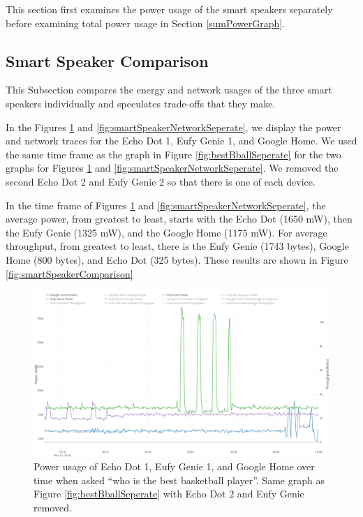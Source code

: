 This section first examines the power usage of the smart speakers separately before examining total power usage in Section \ref{sumPowerGraph}.

\subsection{Smart Speaker Comparison}
\label{smartSpeakerComparisonSection}
This Subsection compares the energy and network usages of the three smart speakers individually and speculates trade-offs that they make.

In the Figures \ref{fig:smartSpeakerSeperate} and \ref{fig:smartSpeakerNetworkSeperate}, we display the power and network traces for the Echo Dot 1, Eufy Genie 1, and Google Home. We used the same time frame as the graph in Figure \ref{fig:bestBballSeperate} for the two graphs for Figures \ref{fig:smartSpeakerSeperate} and \ref{fig:smartSpeakerNetworkSeperate}. We removed the second Echo Dot 2 and Eufy Genie 2 so that there is one of each device.

In the time frame of Figures \ref{fig:smartSpeakerSeperate} and \ref{fig:smartSpeakerNetworkSeperate}, the average power, from greatest to least, starts with the Echo Dot (1650 mW), then the Eufy Genie (1325 mW), and the Google Home (1175 mW). For average throughput, from greatest to least, there is the Eufy Genie (1743 bytes), Google Home (800 bytes), and Echo Dot (325 bytes). These results are shown in Figure \ref{fig:smartSpeakerComparison}

\begin{figure}[H]
  \centering
  \includegraphics[width=1\textwidth]{figures/smartSpeakerSeperate.png}
  \caption{Power usage of Echo Dot 1, Eufy Genie 1, and Google Home over time when asked ``who is the best basketball player''. Same graph as Figure \ref{fig:bestBballSeperate} with Echo Dot 2 and Eufy Genie removed.}
  \label{fig:smartSpeakerSeperate}
\end{figure}

